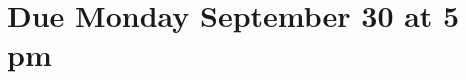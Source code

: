 \documentclass[11pt,fleqn]{article}
\begin{document}
\maketitle
\section*{Due Monday September 30 at 5 pm}










\end{document}
